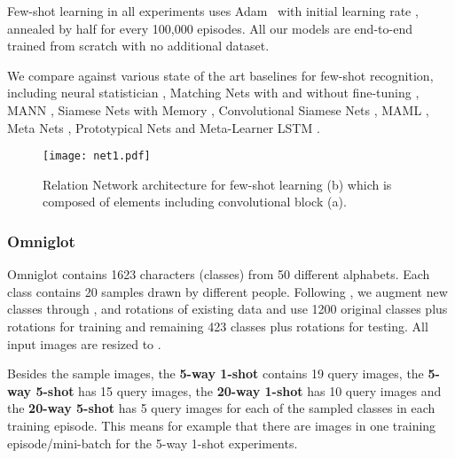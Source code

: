 \documentclass[10pt,twocolumn,letterpaper]{article}
\begin{document}
Few-shot learning in all experiments  uses  Adam~\cite{kingma2014adam} with initial learning rate  , annealed by half for every 100,000 episodes. 
All our models are end-to-end trained from scratch with no additional dataset.

We compare against various state of the art baselines for few-shot recognition, including  neural statistician \cite{edwards2016towards},
Matching Nets with and without fine-tuning \cite{vinyals2016matching},
MANN \cite{santoro2016meta},
Siamese Nets with Memory \cite{kaiser2017learning},
Convolutional Siamese Nets \cite{koch2015siamese},
MAML \cite{finn2017model},
Meta Nets \cite{munkhdalai2017meta},
Prototypical Nets \cite{snell2017prototypical} and
Meta-Learner LSTM \cite{ravi2016optimization}.

\begin{figure}[t]
\begin{center}
\texttt{[image: net1.pdf]}
\end{center}
   \caption{\small Relation Network architecture for few-shot learning (b) which is composed of elements including convolutional block (a).}
\label{fig:networks}
\vspace{-1em}
\end{figure}

\subsubsection{Omniglot}
Omniglot \cite{lake2011one} contains 1623 characters (classes) from 50 different alphabets. Each class contains 20 samples drawn by different people.
Following \cite{santoro2016meta, vinyals2016matching, snell2017prototypical}, we augment new classes through ,  and  rotations of existing data and use 1200 original classes plus rotations for training and remaining 423 classes plus rotations for testing. All input images are resized to . 



Besides the  sample images, the \textbf{5-way 1-shot} contains 19 query images, the \textbf{5-way 5-shot} has 15 query images, the \textbf{20-way 1-shot} has 10 query images and the \textbf{20-way 5-shot} has 5 query images for each of the  sampled classes in each training episode. This means for example that there are   images in one training episode/mini-batch for the 5-way 1-shot experiments.  
\end{document}
